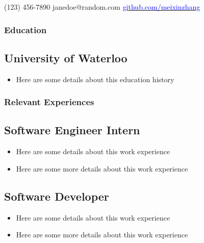 \documentclass{mxresume}
\begin{document}
\contact
    {(123) 456-7890 }
    {janedoe@random.com}
    {\href{https://github.com/meixinzhang} {\textcolor{blue}{github.com/meixinzhang}}}
    {}{}
\vspace*{2mm}
\subsubsection*{\Large{Education}} %
\subsection*{University of Waterloo} 
\begin{itemize}[leftmargin=5mm]
\setlength{\itemsep}{0mm}
\item Here are some details about this education history
\end{itemize}
\subsubsection*{\Large{Relevant Experiences}} %
\subsection*{Software Engineer Intern}
\begin{itemize}[leftmargin=5mm]
\setlength{\itemsep}{0mm}
\item Here are some details about this work experience
\item Here are some more details about this work experience
\end{itemize}
\subsection*{Software Developer}
\begin{itemize}[leftmargin=5mm]
\setlength{\itemsep}{0mm}
\item Here are some details about this work experience
\item Here are some more details about this work experience
\end{itemize}
\end{document}
